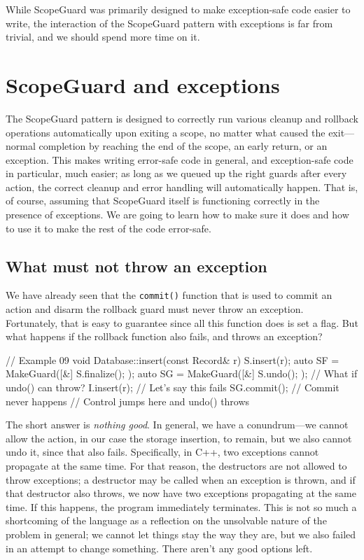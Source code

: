 While ScopeGuard was primarily designed to make exception-safe code easier to write, the interaction of the ScopeGuard pattern with exceptions is far from trivial, and we should spend more time on it.

\section{ScopeGuard and exceptions}

The ScopeGuard pattern is designed to correctly run various cleanup and rollback operations automatically upon exiting a scope, no matter what caused the exit---normal completion by reaching the end of the scope, an early return, or an exception. This makes writing error-safe code in general, and exception-safe code in particular, much easier; as long as we queued up the right guards after every action, the correct cleanup and error handling will automatically happen. That is, of course, assuming that ScopeGuard itself is functioning correctly in the presence of exceptions. We are going to learn how to make sure it does and how to use it to make the rest of the code error-safe.

\subsection{What must not throw an exception}

We have already seen that the \texttt{commit()} function that is used to commit an action and disarm the rollback guard must never throw an exception. Fortunately, that is easy to guarantee since all this function does is set a flag. But what happens if the rollback function also fails, and throws an exception?

\begin{code}
// Example 09
void Database::insert(const Record& r) {
  S.insert(r);
  auto SF = MakeGuard([&] { S.finalize(); });
  auto SG = MakeGuard([&] { S.undo(); });
             // What if undo() can throw?
  I.insert(r);    // Let's say this fails
  SG.commit();    // Commit never happens
}            // Control jumps here and undo() throws
\end{code}

The short answer is \emph{nothing good}. In general, we have a conundrum---we cannot allow the action, in our case the storage insertion, to remain, but we also cannot undo it, since that also fails. Specifically, in C++, two exceptions cannot propagate at the same time. For that reason, the destructors are not allowed to throw exceptions; a destructor may be called when an exception is thrown, and if that destructor also throws, we now have two exceptions propagating at the same time. If this happens, the program immediately terminates. This is not so much a shortcoming of the language as a reflection on the unsolvable nature of the problem in general; we cannot let things stay the way they are, but we also failed in an attempt to change something. There aren't any good options left.

